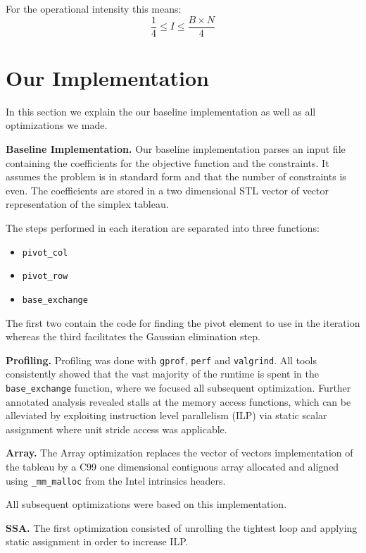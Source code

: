 \documentclass[letterpaper]{article}
\newcommand{\mypar}[1]{{\bf #1.}}
\begin{document}
For the operational intensity this means:
\[ \frac{1}{4} \leq I \leq \frac{B\times N}{4} \]


\section{Our Implementation}\label{sec:yourmethod}

In this section we explain the our baseline implementation as well as all optimizations we made.

\mypar{Baseline Implementation}
Our baseline implementation parses an input file containing the coefficients for the objective function and the constraints.
It assumes the problem is in standard form and that the number of constraints is even.
The coefficients are stored in a two dimensional STL vector of vector representation of the simplex tableau.

The steps performed in each iteration are separated into three functions: 
\begin{itemize}
    \item{\tt pivot\_col}
    \item{\tt pivot\_row}
    \item{\tt base\_exchange}
\end{itemize}
The first two contain the code for finding the pivot element to use in the iteration whereas
the third facilitates the Gaussian elimination step.

\mypar{Profiling}
Profiling was done with {\tt gprof}, {\tt perf} and {\tt valgrind}. All tools consistently showed that the vast majority of the
runtime is spent in the {\tt base\_exchange} function, where we focused all subsequent optimization.
Further annotated analysis revealed stalls at the memory access functions, which can be alleviated by exploiting instruction level parallelism (ILP) via static scalar assignment
where unit stride access was applicable.


\mypar{Array}
The Array optimization replaces the vector of vectors implementation of the tableau by
a C99 one dimensional contiguous array allocated and aligned using {\tt \_mm\_malloc} from
the Intel intrinsics headers.

All subsequent optimizations were based on this implementation.

\mypar{SSA}
The first optimization consisted of unrolling the tightest loop and applying static assignment in order to increase ILP.
\end{document}
